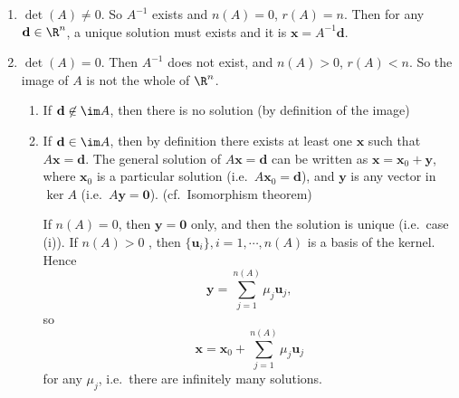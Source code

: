 \documentclass[a4paper]{article}
\begin{document}
\begin{enumerate}
  \item $\det(A) \not= 0$. So $A^{-1}$ exists and $n(A) = 0$, $r(A) = n$. Then for any $\mathbf{d}\in \R^n$, a unique solution must exists and it is $\mathbf{x} = A^{-1}\mathbf{d}$.
  \item $\det(A) = 0$. Then $A^{-1}$ does not exist, and $n(A) > 0$, $r(A) < n$. So the image of $A$ is not the whole of $\R^n$.
    \begin{enumerate}
      \item If $\mathbf{d}\not\in \im A$, then there is no solution (by definition of the image)
      \item If $\mathbf{d}\in \im A$, then by definition there exists at least one $\mathbf{x}$ such that $A\mathbf{x} = \mathbf{d}$. The general solution of $A\mathbf{x} = \mathbf{d}$ can be written as $\mathbf{x} = \mathbf{x}_0 + \mathbf{y}$, where $\mathbf{x}_0$ is a particular solution (i.e.\ $A\mathbf{x}_0 = \mathbf{d}$), and $\mathbf{y}$ is any vector in $\ker A$ (i.e.\ $A\mathbf{y} = \mathbf{0}$). (cf.\ Isomorphism theorem)

        If $n(A) = 0$, then $\mathbf{y = 0}$ only, and then the solution is unique (i.e.\ case (i)). If $n(A) > 0$ , then $\{\mathbf{u}_i\}, i = 1, \cdots, n(A)$ is a basis of the kernel. Hence
        \[
          \mathbf{y} = \sum_{j = 1}^{n(A)} \mu_j \mathbf{u}_j,
        \]
        so
        \[
          \mathbf{x} = \mathbf{x}_0 + \sum_{j = 1}^{n(A)} \mu_j \mathbf{u}_j
        \]
        for any $\mu_j$, i.e.\ there are infinitely many solutions.
    \end{enumerate}
\end{enumerate}
\end{document}

